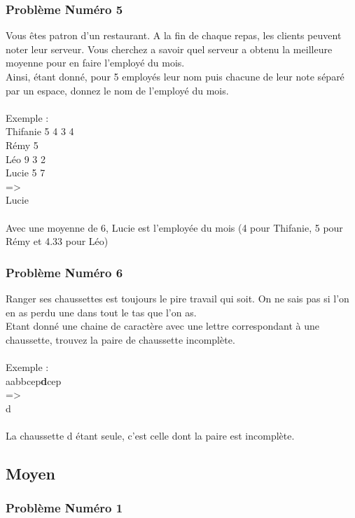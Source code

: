 \documentclass[12pt]{article}
\begin{document}
\subsubsection{Problème Numéro 5}

Vous êtes patron d'un restaurant. A la fin de chaque repas, les clients peuvent noter leur serveur. Vous cherchez a savoir quel serveur a obtenu la meilleure moyenne pour en faire l'employé du mois.\\
Ainsi, étant donné, pour 5 employés leur nom puis chacune de leur note séparé par un espace, donnez le nom de l'employé du mois.
\\\\
Exemple :\\
Thifanie 5 4 3 4\\
Rémy 5\\
Léo 9 3 2\\
Lucie 5 7\\
=\textgreater\\
Lucie
\\\\
Avec une moyenne de 6, Lucie est l'employée du mois (4 pour Thifanie, 5 pour Rémy et 4.33 pour Léo)

\subsubsection{Problème Numéro 6}

Ranger ses chaussettes est toujours le pire travail qui soit. On ne sais pas si l'on en as perdu une dans tout le tas que l'on as.\\
Etant donné une chaine de caractère avec une lettre correspondant à une chaussette, trouvez la paire de chaussette incomplète.
\\\\
Exemple :\\
aabbcep\textbf{d}cep\\
=\textgreater\\
d
\\\\
La chaussette d étant seule, c'est celle dont la paire est incomplète. 

\subsection{Moyen}

\subsubsection{Problème Numéro 1}
\end{document}
